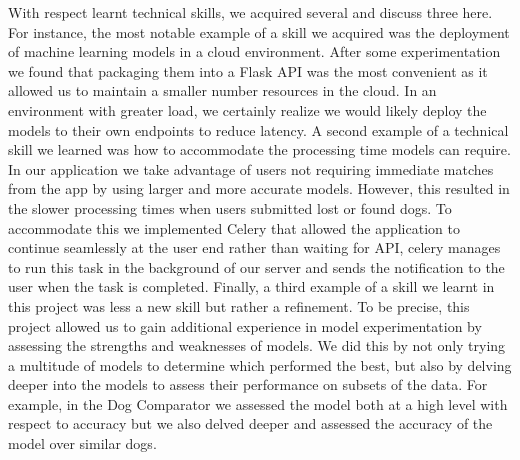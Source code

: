 \documentclass{article}
\begin{document}
With respect learnt technical skills, we acquired several and discuss three here.  For instance, the most notable example of a skill we acquired was the deployment of machine learning models in a cloud environment.  After some experimentation we found that packaging them into a Flask API was the most convenient as it allowed us to maintain a smaller number resources in the cloud.  In an environment with greater load, we certainly realize we would likely deploy the models to their own endpoints to reduce latency.  A second example of a technical skill we learned was how to accommodate the processing time models can require.  In our application we take advantage of users not requiring immediate matches from the app by using larger and more accurate models.  However, this resulted in the slower processing times when users submitted lost or found dogs.  To accommodate this we implemented Celery that allowed the application to continue seamlessly at the user end rather than waiting for API, celery manages to run this task in the background of our server and sends the notification to the user when the task is completed.  Finally, a third example of a skill we learnt in this project was less a new skill but rather a refinement.  To be precise, this project allowed us to gain additional experience in model experimentation by assessing the strengths and weaknesses of models.  We did this by not only trying a multitude of models to determine which performed the best, but also by delving deeper into the models to assess their performance on subsets of the data.  For example, in the Dog Comparator we assessed the model both at a high level with respect to accuracy but we also delved deeper and assessed the accuracy of the model over similar dogs.


\end{document}
